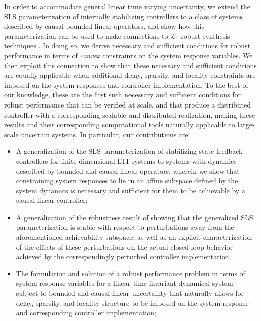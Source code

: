 In order to accommodate general linear time varying uncertainty, we extend the SLS parameterization of internally stabilizing controllers to a class of systems described by causal bounded linear operators, and show how this parameterization can be used to make connections to $\mathcal{L}_1$ robust synthesis techniques \cite{khammash1990stability,dahleh1994control}.  In doing so, we derive necessary and sufficient conditions for robust performance in terms of \emph{convex} constraints on the system response variables.  We then exploit this connection to show that these necessary and sufficient conditions are equally applicable when additional delay, sparsity, and locality constraints are imposed on the system responses and controller implementation.  To the best of our knowledge, these are the first such necessary and sufficient conditions for robust performance that can be verified at scale, and that produce a distributed controller with a corresponding scalable and distributed realization, making these results and their corresponding computational tools naturally applicable to large-scale uncertain systems.  In particular, our contributions are:
\begin{itemize}[leftmargin=*]
\item A generalization of the SLS parameterization of stabilizing state-feedback controllers for finite-dimensional LTI systems \cite{wang2019system} to systems with dynamics described by bounded and causal linear operators, wherein we show that constraining system responses to lie in an affine subspace defined by the system dynamics is necessary and sufficient for them to be achievable by a causal linear controller;
\item A generalization of the robustness result of \cite{matni2017scalable} showing that the  generalized SLS parameterization is stable with respect to perturbations away from the aforementioned achievability subspace, as well as an explicit characterization of the effects of these perturbations on the actual closed loop behavior achieved by the correspondingly perturbed controller implementation;
\item The formulation and solution of a robust performance problem in terms of system response variables for a linear-time-invariant dynamical system subject to bounded and causal linear uncertainty that naturally allows for delay, sparsity, and locality structure to be imposed on the system response and corresponding controller implementation;
\end{itemize}

